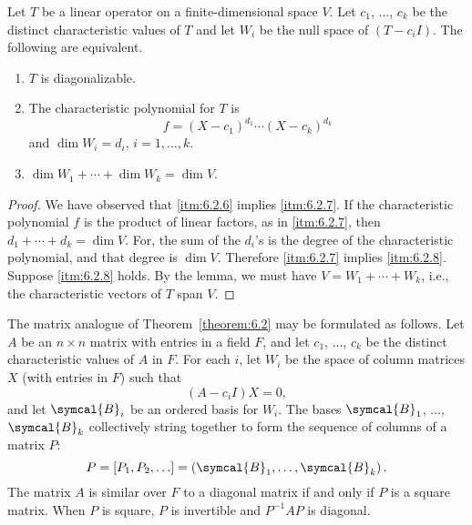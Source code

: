 \begin{theorem}\label{theorem:6.2}
    Let \(T\) be a linear operator on a finite-dimensional space \(V\). Let \(c_1\), \(\ldots\), \(c_k\) be the distinct characteristic values of \(T\) and let \(W_i\) be the null space of \(\left(T-c_iI\right)\). The following are equivalent.
    \begin{enumerate}
        \item\label{itm:6.2.6} \(T\) is diagonalizable.
        \item\label{itm:6.2.7} The characteristic polynomial for \(T\) is
            \begin{equation*}
                f=\left(X-c_1\right)^{d_1}\cdots\left(X-c_k\right)^{d_k}
            \end{equation*}
            and \(\dim W_i=d_i\), \(i=1,\ldots,k\).
        \item\label{itm:6.2.8} \(\dim W_1+\cdots+\dim W_k=\dim V\).
    \end{enumerate}
\end{theorem}

\begin{proof}
    We have observed that \ref{itm:6.2.6} implies \ref{itm:6.2.7}. If the characteristic polynomial \(f\) is the product of linear factors, as in \ref{itm:6.2.7}, then \(d_1+\cdots+d_k=\dim V\). For, the sum of the \(d_i\)'s is the degree of the characteristic polynomial, and that degree is \(\dim V\). Therefore \ref{itm:6.2.7} implies \ref{itm:6.2.8}. Suppose \ref{itm:6.2.8} holds. By the lemma, we must have \(V=W_1+\cdots+W_k\), i.e., the characteristic vectors of \(T\) span \(V\).
\end{proof}

The matrix analogue of Theorem~\ref{theorem:6.2} may be formulated as follows. Let \(A\) be an \(n\times n\) matrix with entries in a field \(F\), and let \(c_1\), \(\ldots\), \(c_k\) be the distinct characteristic values of \(A\) in \(F\). For each \(i\), let \(W_i\) be the space of column matrices \(X\) (with entries in \(F\)) such that
\begin{equation*}
   \left(A-c_iI\right)X=0,
\end{equation*}
and let \(\symcal{B}_i\) be an ordered basis for \(W_i\). The bases \(\symcal{B}_1\), \(\ldots\), \(\symcal{B}_k\) collectively string together to form the sequence of columns of a matrix \(P\):
\begin{equation*}
    P=\left[P_1,P_2,\ldots\right]=\left(\symcal{B}_1,\ldots,\symcal{B}_k\right).
\end{equation*}
The matrix \(A\) is similar over \(F\) to a diagonal matrix if and only if \(P\) is a square matrix. When \(P\) is square, \(P\) is invertible and \(P^{-1}AP\) is diagonal.

